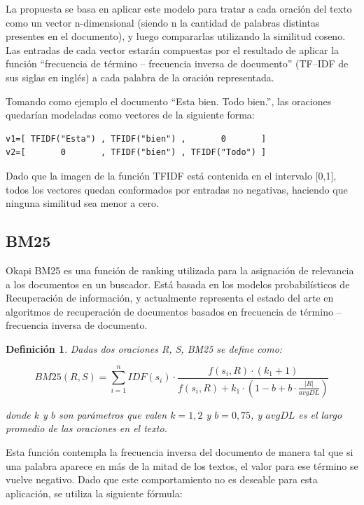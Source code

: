 \documentclass{llncs}
\newtheorem{definicion}{Definición}
\begin{document}
La propuesta se basa en aplicar este modelo para tratar a cada oración del texto como un vector n-dimensional (siendo n la cantidad de palabras distintas presentes en el documento), y luego compararlas utilizando la similitud coseno. Las entradas de cada vector estarán compuestas por el resultado de aplicar la función “frecuencia de término -- frecuencia inversa de documento” (TF--IDF de sus siglas en inglés) a cada palabra de la oración representada.

Tomando como ejemplo el documento “Esta bien. Todo bien.”, las oraciones quedarían modeladas como vectores de la siguiente forma:

\begin{Verbatim}[xleftmargin=3em]
v1=[ TFIDF("Esta") , TFIDF("bien") ,       0       ]
v2=[       0       , TFIDF("bien") , TFIDF("Todo") ]
\end{Verbatim}

Dado que la imagen de la función TFIDF está contenida en el intervalo [0,1], todos los vectores quedan conformados por entradas no negativas, haciendo que ninguna similitud sea menor a cero. 

\subsection{BM25}
Okapi BM25 es una función de ranking utilizada para la asignación de relevancia a los documentos en un buscador. 
Está basada en los modelos probabilísticos de Recuperación de información, y actualmente 
representa el estado del arte en algoritmos de recuperación de documentos basados en frecuencia de término -- frecuencia inversa de documento.

\begin{definicion}
Dadas dos oraciones R, S, BM25 se define como:

\begin{equation}
BM25(R,S) = \sum_{i=1}^{n} IDF(s_i) \cdot \frac{f(s_i, R) \cdot (k_1 + 1)}{f(s_i, R) + k_1 \cdot (1 - b + b \cdot \frac{|R|}{avgDL})}
\end{equation}

donde $k$ y $b$ son parámetros que valen $k = 1,2$ y $b = 0,75$, y $avgDL$ es el largo promedio de las oraciones en el texto.
\end{definicion}

Esta función contempla la frecuencia inversa del documento de manera tal que si una palabra aparece en más de la mitad de los textos, el valor para ese término se vuelve negativo. Dado que este comportamiento no es deseable para esta aplicación, se utiliza la siguiente fórmula:
                
\end{document}
